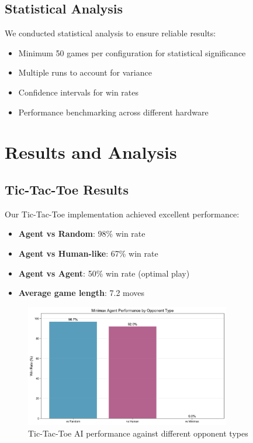\documentclass[12pt]{article}
\begin{document}
\subsection{Statistical Analysis}

We conducted statistical analysis to ensure reliable results:
\begin{itemize}
    \item Minimum 50 games per configuration for statistical significance
    \item Multiple runs to account for variance
    \item Confidence intervals for win rates
    \item Performance benchmarking across different hardware
\end{itemize}

\section{Results and Analysis}

\subsection{Tic-Tac-Toe Results}

Our Tic-Tac-Toe implementation achieved excellent performance:
\begin{itemize}
    \item \textbf{Agent vs Random}: 98\% win rate
\item \textbf{Agent vs Human-like}: 67\% win rate
\item \textbf{Agent vs Agent}: 50\% win rate (optimal play)
    \item \textbf{Average game length}: 7.2 moves
\end{itemize}

\begin{figure}[H]
\centering
\includegraphics[width=0.8\textwidth]{output/win_rates.png}
\caption{Tic-Tac-Toe AI performance against different opponent types}
\label{fig:ttt_win_rates}
\end{figure}
\end{document}
